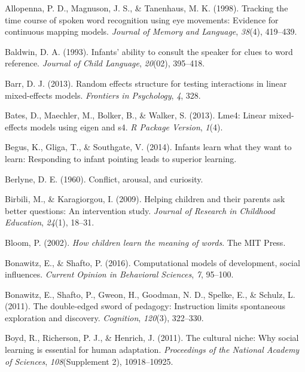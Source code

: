 \documentclass[oneside]{report}
\begin{document}
\hypertarget{ref-allopenna1998tracking}{}
Allopenna, P. D., Magnuson, J. S., \& Tanenhaus, M. K. (1998). Tracking
the time course of spoken word recognition using eye movements: Evidence
for continuous mapping models. \emph{Journal of Memory and Language},
\emph{38}(4), 419--439.

\hypertarget{ref-baldwin1993infants}{}
Baldwin, D. A. (1993). Infants' ability to consult the speaker for clues
to word reference. \emph{Journal of Child Language}, \emph{20}(02),
395--418.

\hypertarget{ref-barr2013random}{}
Barr, D. J. (2013). Random effects structure for testing interactions in
linear mixed-effects models. \emph{Frontiers in Psychology}, \emph{4},
328.

\hypertarget{ref-bates2013lme4}{}
Bates, D., Maechler, M., Bolker, B., \& Walker, S. (2013). Lme4: Linear
mixed-effects models using eigen and s4. \emph{R Package Version},
\emph{1}(4).

\hypertarget{ref-begus2014infants}{}
Begus, K., Gliga, T., \& Southgate, V. (2014). Infants learn what they
want to learn: Responding to infant pointing leads to superior learning.

\hypertarget{ref-berlyne1960conflict}{}
Berlyne, D. E. (1960). Conflict, arousal, and curiosity.

\hypertarget{ref-birbili2009helping}{}
Birbili, M., \& Karagiorgou, I. (2009). Helping children and their
parents ask better questions: An intervention study. \emph{Journal of
Research in Childhood Education}, \emph{24}(1), 18--31.

\hypertarget{ref-bloom2002children}{}
Bloom, P. (2002). \emph{How children learn the meaning of words}. The
MIT Press.

\hypertarget{ref-bonawitz2016computational}{}
Bonawitz, E., \& Shafto, P. (2016). Computational models of development,
social influences. \emph{Current Opinion in Behavioral Sciences},
\emph{7}, 95--100.

\hypertarget{ref-bonawitz2011double}{}
Bonawitz, E., Shafto, P., Gweon, H., Goodman, N. D., Spelke, E., \&
Schulz, L. (2011). The double-edged sword of pedagogy: Instruction
limits spontaneous exploration and discovery. \emph{Cognition},
\emph{120}(3), 322--330.

\hypertarget{ref-boyd2011cultural}{}
Boyd, R., Richerson, P. J., \& Henrich, J. (2011). The cultural niche:
Why social learning is essential for human adaptation. \emph{Proceedings
of the National Academy of Sciences}, \emph{108}(Supplement 2),
10918--10925.
\end{document}
